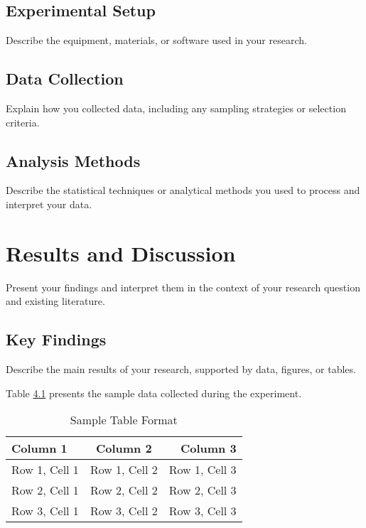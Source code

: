 \section{Experimental Setup}
Describe the equipment, materials, or software used in your research.

\section{Data Collection}
Explain how you collected data, including any sampling strategies or selection criteria.

\section{Analysis Methods}
Describe the statistical techniques or analytical methods you used to process and interpret your data.

\chapter{Results and Discussion}
Present your findings and interpret them in the context of your research question and existing literature.

\section{Key Findings}
Describe the main results of your research, supported by data, figures, or tables.

Table \ref{tab:sample_table} presents the sample data collected during the experiment.

\begin{table}[ht]
    \centering
    \caption{Sample Table Format}  %
    \label{tab:sample_table}       %
    \begin{tabular}{|l|c|r|}       %
        \hline
        \textbf{Column 1} & \textbf{Column 2} & \textbf{Column 3} \\
        \hline
        Row 1, Cell 1 & Row 1, Cell 2 & Row 1, Cell 3 \\
        Row 2, Cell 1 & Row 2, Cell 2 & Row 2, Cell 3 \\
        Row 3, Cell 1 & Row 3, Cell 2 & Row 3, Cell 3 \\
        \hline
    \end{tabular}
\end{table}

